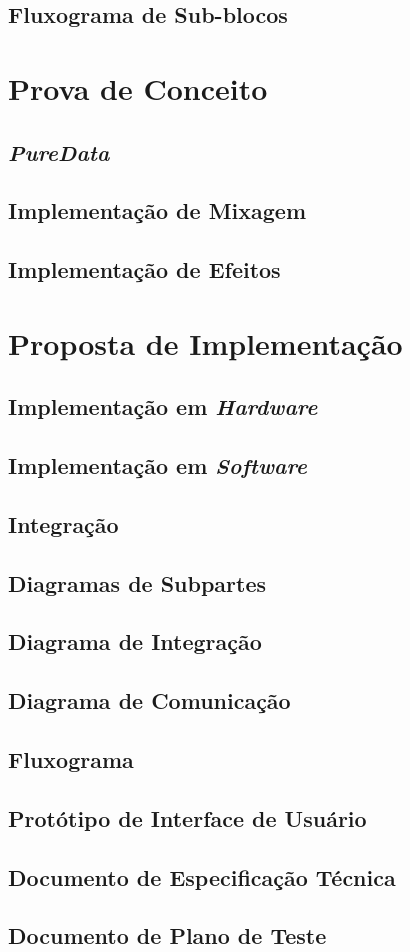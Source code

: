 \subsection{Fluxograma de Sub-blocos}

\section{Prova de Conceito}

	\subsection{\textit{PureData}}

	\subsection{Implementação de Mixagem}

	\subsection{Implementação de Efeitos}

\section{Proposta de Implementação}

	\subsection{Implementação em \textit{Hardware}}

	\subsection{Implementação em \textit{Software}}

	\subsection{Integração}

\subsection{Diagramas de Subpartes}
\subsection{Diagrama de Integração}
\subsection{Diagrama de Comunicação}
\subsection{Fluxograma}
\subsection{Protótipo de Interface de Usuário}
\subsection{Documento de Especificação Técnica}
\subsection{Documento de Plano de Teste}